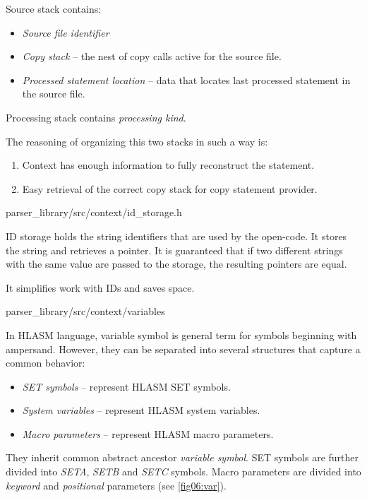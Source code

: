 Source stack contains:
\begin{itemize}
	\item \emph{Source file identifier}
	\item \emph{Copy stack} -- the nest of copy calls active for the source file.
	\item \emph{Processed statement location} -- data that locates last processed statement in the source file.
\end{itemize}
Processing stack contains \emph{processing kind}.

The reasoning of organizing this two stacks in such a way is:
\begin{enumerate}
	\item Context has enough information to fully reconstruct the statement.
	\item Easy retrieval of the correct copy stack for copy statement provider.
\end{enumerate} 

{parser\_library/src/context/id\_storage.h}

ID storage holds the string identifiers that are used by the open-code. 
It stores the string and retrieves a pointer. It is guaranteed that if two different strings with the same value are passed to the storage, the resulting pointers are equal.

It simplifies work with IDs and saves space. 

{parser\_library/src/context/variables}
\label{lab06:var_sym}

In HLASM language, variable symbol is general term for symbols beginning with ampersand. However, they can be separated into several structures that capture a common behavior:

\begin{itemize}
	\item \emph{SET symbols} -- represent HLASM SET symbols.
	\item \emph{System variables} -- represent HLASM system variables.
	\item \emph{Macro parameters} -- represent HLASM macro parameters.
\end{itemize}

They inherit common abstract ancestor \emph{variable symbol}. SET symbols are further divided into \emph{SETA}, \emph{SETB} and \emph{SETC} symbols. Macro parameters are divided into \emph{keyword} and \emph{positional} parameters (see \cref{fig06:var}).

